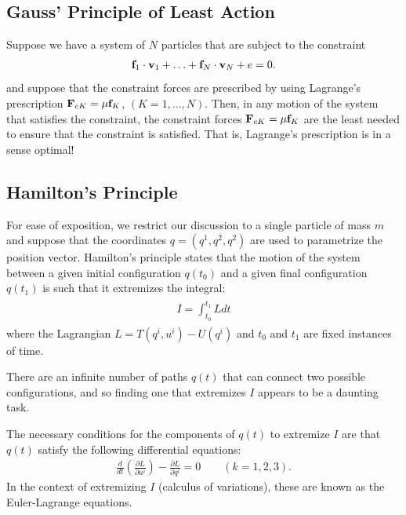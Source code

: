 \documentclass[
  letterpaper,
  DIV=11,
  numbers=noendperiod]{scrreprt}
\newcommand{\lp}{\left(}
\newcommand{\rp}{\right)}
\providecommand{\hdots}{\ldots}
\begin{document}
\subsection{Gauss' Principle of Least
Action}\label{gauss-principle-of-least-action}

Suppose we have a system of \(N\) particles that are subject to the
constraint \begin{align*}
    {\bf f}_1\cdot{\bf v}_1+\hdots+{\bf f}_N\cdot{\bf v}_N + e = 0.
\end{align*} and suppose that the constraint forces are prescribed by
using Lagrange's prescription \({\bf F}_{cK} = \mu{\bf f}_K\),
\((K=1,\hdots,N)\). Then, in any motion of the system that satisfies the
constraint, the constraint forces \({\bf F}_{cK} = \mu{\bf f}_K\) are
the least needed to ensure that the constraint is satisfied. That is,
Lagrange's prescription is in a sense optimal!

\subsection{Hamilton's Principle}\label{hamiltons-principle}

For ease of exposition, we restrict our discussion to a single particle
of mass \(m\) and suppose that the coordinates \(q = (q^1,q^2,q^2)\) are
used to parametrize the position vector. Hamilton's principle states
that the motion of the system between a given initial configuration
\(q(t_0)\) and a given final configuration \(q(t_1)\) is such that it
extremizes the integral: \begin{align}
    \begin{split}
        I = \int_{t_0}^{t_1}Ldt
    \end{split}
\end{align} where the Lagrangian \(L = T(q^i,u^i)-U(q^i)\) and \(t_0\)
and \(t_1\) are fixed instances of time.

There are an infinite number of paths \(q(t)\) that can connect two
possible configurations, and so finding one that extremizes \(I\)
appears to be a daunting task.

The necessary conditions for the components of \(q(t)\) to extremize
\(I\) are that \(q(t)\) satisfy the following differential equations:
\begin{align}
    \frac{d}{dt}\lp\frac{\partial L}{\partial u^i}\rp-\frac{\partial L}{\partial q^i} = 0\qquad (k = 1,2,3).
\end{align} In the context of extremizing \(I\) (calculus of
variations), these are known as the Euler-Lagrange equations.
\end{document}

